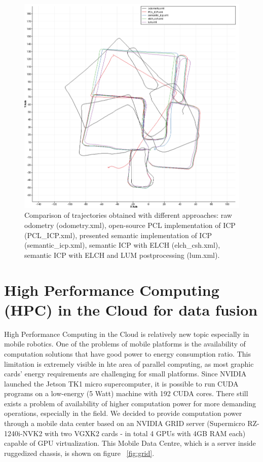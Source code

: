 \documentclass{article}
\begin{document}
\begin{figure} [h]
            \centering
         \includegraphics[width=\textwidth]{ROB-15-0035_fig10.png}
         \caption{Comparison of trajectories obtained with different approaches: raw odometry (odometry.xml), open-source PCL implementation of ICP (PCL\_ICP.xml), presented semantic implementation of ICP (semantic\_icp.xml), semantic ICP with ELCH (elch\_csh.xml), semantic ICP with ELCH and LUM postprocessing (lum.xml).}
         \label{fig:comparison}
   \end{figure}

\afterpage{\clearpage}


\section{High Performance Computing (HPC) in the Cloud for data fusion} 


High Performance Computing in the Cloud is relatively new topic especially in mobile robotics. One of the problems of mobile platforms is the availability of computation solutions that have good power to energy consumption ratio. This limitation is extremely visible in hte area of parallel computing, as most graphic cards' energy requirements are challenging for small platforms.
Since NVIDIA launched the Jetson TK1 micro supercomputer, it is possible to run CUDA programs on a low-energy (5 Watt) machine with 192 CUDA cores.
There still exists a problem of availability of higher computation power for more demanding operations, especially in the field.
We decided to provide computation power through a mobile data center based on an NVIDIA GRID server (Supermicro RZ-1240i-NVK2 with two VGXK2 cards - in total 4 GPUs with 4GB RAM each) capable of GPU virtualization.
This Mobile Data Centre, which is a server inside ruggedized chassis, is shown on figure ~\ref{fig:grid}.
\end{document}
